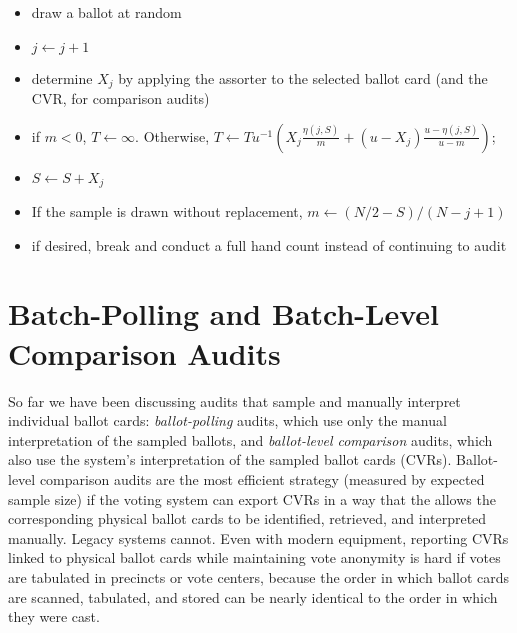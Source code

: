 \documentclass[12pt,runningheads]{llncs}
\begin{document}
{\begin{itemize}
   \begin{itemize}
        \item draw a ballot at random
        \item $j \leftarrow j+1$
        \item determine $X_j$ by applying the assorter to the selected ballot card (and the CVR, for comparison audits)
        \item if $m < 0$, $T \leftarrow \infty$. Otherwise, $T \leftarrow T u^{-1} \left ( X_j\frac{\eta(j, S)}{m} + (u-X_j) \frac{u-\eta(j,S)}{u-m} \right )$; 
        \item $S \leftarrow S+X_j$
        \item If the sample is drawn without replacement, $m \leftarrow (N/2 - S)/(N-j+1)$
        \item if desired, break and conduct a full hand count instead of continuing to audit
    \end{itemize}
\end{itemize}

\section{Batch-Polling and Batch-Level Comparison Audits} \label{sec:batch-audits}

So far we have been discussing audits that sample and manually interpret individual ballot cards: \emph{ballot-polling} audits,
which use only the manual interpretation of the sampled ballots, and \emph{ballot-level comparison} audits, which also use the system's
interpretation of the sampled ballot cards (CVRs).
Ballot-level comparison audits are the most efficient strategy (measured by expected sample size) if the voting system can export CVRs in a
way that the allows the corresponding physical ballot cards to be identified, retrieved, and interpreted manually.
Legacy systems cannot.
Even with modern equipment, reporting CVRs linked to physical ballot cards while maintaining vote anonymity is hard
if votes are tabulated in precincts or vote centers, because the order in which ballot cards are scanned, tabulated, and stored 
can be nearly identical to the order in which they were cast. 

}
\end{document}

